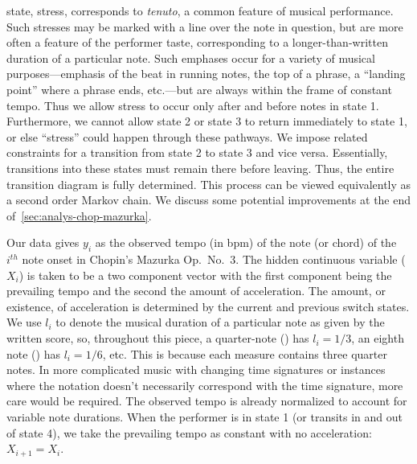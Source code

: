 \documentclass[12pt]{article}
\begin{document}
state, stress, corresponds to {\em tenuto}, a common feature of
musical performance. Such stresses may be marked with a line over the
note in question, but are more often a feature of the performer taste,
corresponding to a longer-than-written duration of a particular
note. Such emphases occur for a variety of musical purposes---emphasis
of the beat in running notes, the top of a
phrase, a ``landing point'' where a phrase ends, etc.---but are always
within the frame of constant tempo. Thus we allow stress to occur only
after and before notes in state 1. Furthermore, we cannot allow
state 2 or state 3 to return immediately to state 1, or else ``stress'' could
happen through these pathways. We impose related constraints for a transition from state 2
to state 3 and vice versa. Essentially, transitions into these states must remain
there before leaving. Thus, the entire transition diagram is
fully determined. This process can  be viewed equivalently as a second
order Markov chain. We discuss some potential improvements at the end
of~\autoref{sec:analys-chop-mazurka}. 


Our data gives $y_i$ as the observed tempo (in bpm) of the note (or
chord) of the $i^{th}$ note onset in Chopin's Mazurka Op.\ No.\ 3. The
hidden continuous variable ($X_i$) is 
taken to be a two component vector with the first component being the
prevailing tempo and the second the amount of acceleration. The amount, or
existence, of acceleration is determined by the current and previous
switch states. We use $l_i$ to denote the musical duration of
a particular note as given by the written score, so, throughout this piece, a quarter-note (\quarternote) has $l_i=1/3$, an
eighth note (\eighthnote) has $l_i=1/6$, etc. This is because each
measure contains three quarter notes. In more complicated
music with changing time signatures or instances where the notation
doesn't necessarily correspond with the time signature, more care
would be required. The observed tempo is already normalized to account
for variable note durations. When the performer is in state 1 (or
transits in and out of state 4), we take the prevailing tempo as
constant with no acceleration: $X_{i+1} = X_i$. 
\end{document}
